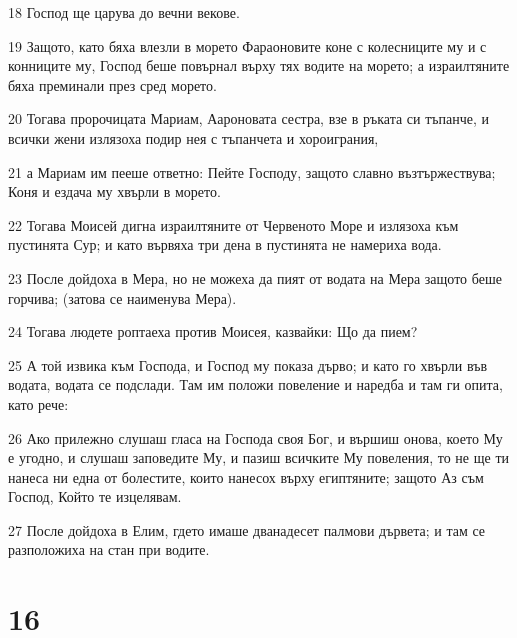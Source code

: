 \par 18 Господ ще царува до вечни векове.
\par 19 Защото, като бяха влезли в морето Фараоновите коне с колесниците му и с конниците му, Господ беше повърнал върху тях водите на морето; а израилтяните бяха преминали през сред морето.
\par 20 Тогава пророчицата Мариам, Аароновата сестра, взе в ръката си тъпанче, и всички жени излязоха подир нея с тъпанчета и хороиграния,
\par 21 а Мариам им пееше ответно: Пейте Господу, защото славно възтържествува; Коня и ездача му хвърли в морето.
\par 22 Тогава Моисей дигна израилтяните от Червеното Море и излязоха към пустинята Сур; и като вървяха три дена в пустинята не намериха вода.
\par 23 После дойдоха в Мера, но не можеха да пият от водата на Мера защото беше горчива; (затова се наименува Мера).
\par 24 Тогава людете роптаеха против Моисея, казвайки: Що да пием?
\par 25 А той извика към Господа, и Господ му показа дърво; и като го хвърли във водата, водата се подслади. Там им положи повеление и наредба и там ги опита, като рече:
\par 26 Ако прилежно слушаш гласа на Господа своя Бог, и вършиш онова, което Му е угодно, и слушаш заповедите Му, и пазиш всичките Му повеления, то не ще ти нанеса ни една от болестите, които нанесох върху египтяните; защото Аз съм Господ, Който те изцелявам.
\par 27 После дойдоха в Елим, гдето имаше дванадесет палмови дървета; и там се разположиха на стан при водите.

\chapter{16}

